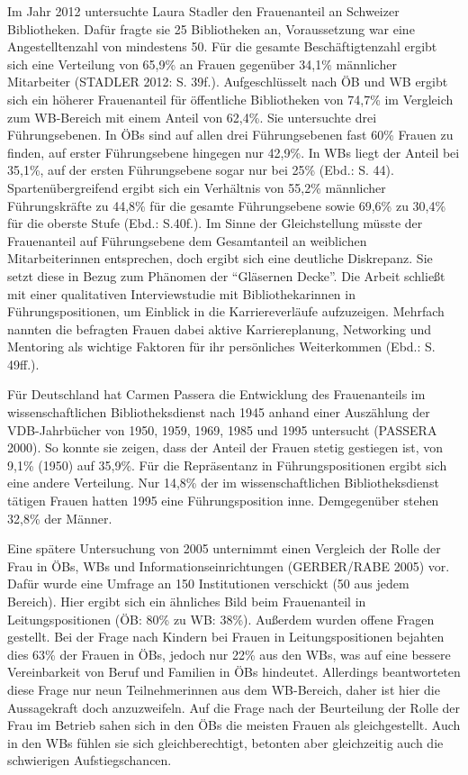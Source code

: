 \documentclass[a4paper,
fontsize=11pt,
oneside,
numbers=noperiodatend,
parskip=half-,
bibliography=totoc,
final
]{scrartcl}
\begin{document}
Im Jahr 2012 untersuchte Laura Stadler den Frauenanteil an Schweizer
Bibliotheken. Dafür fragte sie 25 Bibliotheken an, Voraussetzung war
eine Angestelltenzahl von mindestens 50. Für die gesamte
Beschäftigtenzahl ergibt sich eine Verteilung von 65,9\% an Frauen
gegenüber 34,1\% männlicher Mitarbeiter (STADLER 2012: S. 39f.).
Aufgeschlüsselt nach ÖB und WB ergibt sich ein höherer Frauenanteil für
öffentliche Bibliotheken von 74,7\% im Vergleich zum WB-Bereich mit
einem Anteil von 62,4\%. Sie untersuchte drei Führungsebenen. In ÖBs
sind auf allen drei Führungsebenen fast 60\% Frauen zu finden, auf
erster Führungsebene hingegen nur 42,9\%. In WBs liegt der Anteil bei
35,1\%, auf der ersten Führungsebene sogar nur bei 25\% (Ebd.: S. 44).
Spartenübergreifend ergibt sich ein Verhältnis von 55,2\% männlicher
Führungskräfte zu 44,8\% für die gesamte Führungsebene sowie 69,6\% zu
30,4\% für die oberste Stufe (Ebd.: S.40f.). Im Sinne der Gleichstellung
müsste der Frauenanteil auf Führungsebene dem Gesamtanteil an weiblichen
Mitarbeiterinnen entsprechen, doch ergibt sich eine deutliche
Diskrepanz. Sie setzt diese in Bezug zum Phänomen der \enquote{Gläsernen
Decke}. Die Arbeit schließt mit einer qualitativen Interviewstudie mit
Bibliothekarinnen in Führungspositionen, um Einblick in die
Karriereverläufe aufzuzeigen. Mehrfach nannten die befragten Frauen
dabei aktive Karriereplanung, Networking und Mentoring als wichtige
Faktoren für ihr persönliches Weiterkommen (Ebd.: S. 49ff.).

Für Deutschland hat Carmen Passera die Entwicklung des Frauenanteils im
wissenschaftlichen Bibliotheksdienst nach 1945 anhand einer Auszählung
der VDB-Jahrbücher von 1950, 1959, 1969, 1985 und 1995 untersucht
(PASSERA 2000). So konnte sie zeigen, dass der Anteil der Frauen stetig
gestiegen ist, von 9,1\% (1950) auf 35,9\%. Für die Repräsentanz in
Führungspositionen ergibt sich eine andere Verteilung. Nur 14,8\% der im
wissenschaftlichen Bibliotheksdienst tätigen Frauen hatten 1995 eine
Führungsposition inne. Demgegenüber stehen 32,8\% der Männer.

Eine spätere Untersuchung von 2005 unternimmt einen Vergleich der Rolle
der Frau in ÖBs, WBs und Informationseinrichtungen (GERBER/RABE 2005)
vor. Dafür wurde eine Umfrage an 150 Institutionen verschickt (50 aus
jedem Bereich). Hier ergibt sich ein ähnliches Bild beim Frauenanteil in
Leitungspositionen (ÖB: 80\% zu WB: 38\%). Außerdem wurden offene Fragen
gestellt. Bei der Frage nach Kindern bei Frauen in Leitungspositionen
bejahten dies 63\% der Frauen in ÖBs, jedoch nur 22\% aus den WBs, was
auf eine bessere Vereinbarkeit von Beruf und Familien in ÖBs hindeutet.
Allerdings beantworteten diese Frage nur neun Teilnehmerinnen aus dem
WB-Bereich, daher ist hier die Aussagekraft doch anzuzweifeln. Auf die
Frage nach der Beurteilung der Rolle der Frau im Betrieb sahen sich in
den ÖBs die meisten Frauen als gleichgestellt. Auch in den WBs fühlen
sie sich gleichberechtigt, betonten aber gleichzeitig auch die
schwierigen Aufstiegschancen.
\end{document}
